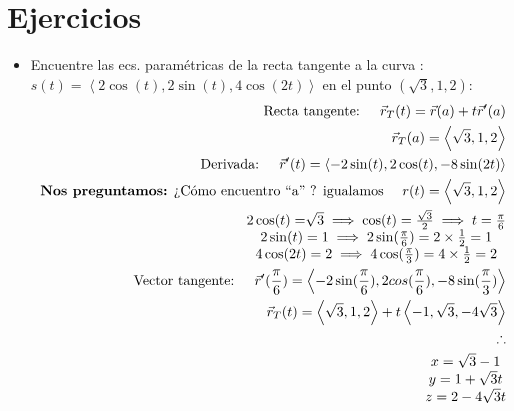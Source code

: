 \documentclass{article}
\begin{document}
\section{Ejercicios}
\begin{itemize}
    \item Encuentre las ecs. paramétricas de la recta tangente a la curva : $s(t)=\left\langle 2\cos(t),2\sin(t),4\cos(2t) \right\rangle $ en el punto $(\sqrt{3},1,2)$:
        \begin{align*}
            \text{  Recta tangente:  } \quad \vec{r}_T(t) = \vec{r}(a)+t \vec{r}'(a) \\ 
            \vec{r}_T(a) = \left\langle \sqrt{3},1,2 \right\rangle \\ 
            \text{  Derivada: } \quad \vec{r}'(t) = \left\langle -2\sin(t),2\cos(t),-8\sin(2t) \right\rangle \\ 
            \text{  \textbf{Nos preguntamos:} ¿Cómo encuentro ``a'' ? igualamos   } \quad r(t) = \left\langle \sqrt{3},1,2 \right\rangle  \\ 
            \begin{matrix}
                2\cos(t) = \sqrt[]{3} \implies \cos(t) = \frac{\sqrt{3}}{2} \implies t = \frac{\pi }{6}  \\ 
                2\sin(t) = 1 \implies 2\sin(\frac{\pi }{6} ) = 2 \times \frac{1}{2} = 1\\ 
                4 \cos(2t)=2 \implies 4\cos(\frac{\pi }{3} ) = 4 \times \frac{1}{2} = 2\\ 
            \end{matrix} \\ 
            \text{  Vector tangente:   } \quad \vec{r}'(\frac{\pi }{6} )= \left\langle -2\sin(\frac{\pi }{6}),2cos(\frac{\pi}{6} ), -8\sin(\frac{\pi }{3} )  \right\rangle \\ 
            \vec{r}_T(t)= \left\langle \sqrt{3},1,2 \right\rangle + t \left\langle -1,\sqrt{3},-4\sqrt{3} \right\rangle \\ 
            \therefore  \\ 
            \begin{matrix}
                x= \sqrt{3}-1 \\ 
                y=1+\sqrt{3}t \\ 
                z=2-4\sqrt{3}t \\ 
            \end{matrix}\\ 
        \end{align*}
\end{itemize}
\end{document}
